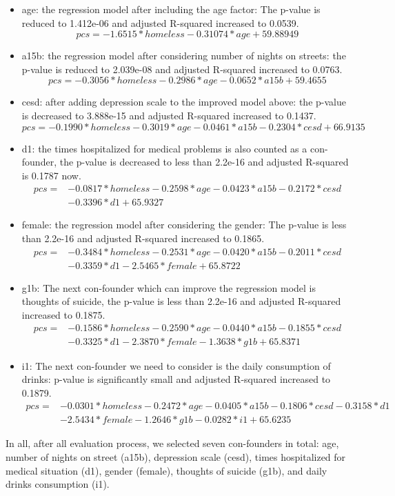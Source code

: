\documentclass{report}
\begin{document}
\begin{itemize}
    \item age: the regression model after including the age factor: The p-value is reduced to 1.412e-06 and adjusted R-squared increased to 0.0539.\[pcs = -1.6515 * homeless - 0.31074 * age + 59.88949\] 
    \item a15b: the regression model after considering number of nights on streets: the p-value is reduced to 2.039e-08 and adjusted R-squared increased to 0.0763. \[pcs = -0.3056 * homeless - 0.2986 * age - 0.0652 * a15b + 59.4655\]
    \item cesd: after adding depression scale to the improved model above: the p-value is decreased to 3.888e-15 and adjusted R-squared increased to 0.1437. \[pcs = -0.1990 * homeless - 0.3019 * age - 0.0461 * a15b - 0.2304 * cesd + 66.9135\]
    \item d1: the times hospitalized for medical problems is also counted as a con-founder, the p-value is decreased to less than 2.2e-16 and adjusted R-squared is 0.1787 now.
    \begin{align*}
        pcs = &- 0.0817 * homeless - 0.2598 * age - 0.0423 * a15b - 0.2172 * cesd\\
              & - 0.3396 * d1 + 65.9327
    \end{align*}
    \item female: the regression model after considering the gender: The p-value is less than 2.2e-16 and adjusted R-squared increased to 0.1865.
    \begin{align*}
        pcs = &- 0.3484 * homeless - 0.2531 * age - 0.0420 * a15b - 0.2011 * cesd\\
              & - 0.3359 * d1 - 2.5465 * female + 65.8722
    \end{align*}
    \item g1b: The next con-founder which can improve the regression model is thoughts of suicide, the p-value is less than 2.2e-16 and adjusted R-squared increased to 0.1875.
    \begin{align*}
        pcs = &-0.1586 * homeless - 0.2590 * age - 0.0440 * a15b - 0.1855 * cesd\\
              & - 0.3325 * d1 - 2.3870 * female - 1.3638 * g1b + 65.8371
    \end{align*}
    \item i1: The next con-founder we need to consider is the daily consumption of drinks: p-value is significantly small and adjusted R-squared increased to 0.1879.
    \begin{align*}
        pcs = &-0.0301 * homeless - 0.2472 * age - 0.0405 * a15b - 0.1806 * cesd - 0.3158 * d1\\
              & - 2.5434 * female - 1.2646 * g1b - 0.0282 * i1 + 65.6235
    \end{align*}
\end{itemize}
In all, after all evaluation process, we selected seven con-founders in total: age, number of nights on street (a15b), depression scale (cesd), times hospitalized for medical situation (d1), gender (female), thoughts of suicide (g1b), and daily drinks consumption (i1).
\end{document}
